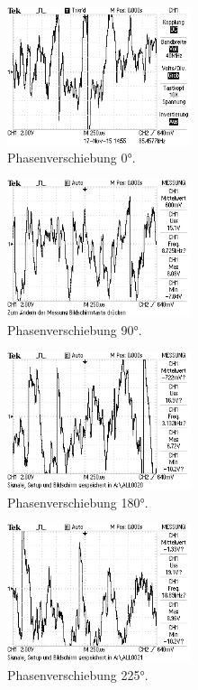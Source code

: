 \begin{figure}
   \centering
   \includegraphics[width=0.48\textwidth]{bilder/Mit Rauschen/1.JPG}
 \caption{Phasenverschiebung 0°.}
   \label{fig:1}
 \end{figure}

 \begin{figure}
   \centering
   \includegraphics[width=0.48\textwidth]{bilder/Mit Rauschen/2.JPG}
 \caption{Phasenverschiebung 90°.}
   \label{fig:2}
 \end{figure}

 \begin{figure}
   \centering
   \includegraphics[width=0.48\textwidth]{bilder/Mit Rauschen/3.JPG}
 \caption{Phasenverschiebung 180°.}
   \label{fig:3}
 \end{figure}

 \begin{figure}
   \centering
   \includegraphics[width=0.48\textwidth]{bilder/Mit Rauschen/4.JPG}
 \caption{Phasenverschiebung 225°.}
   \label{fig:4}
 \end{figure}

